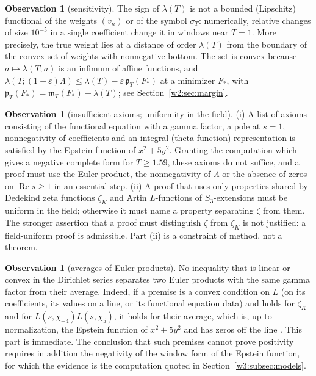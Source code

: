 \documentclass[11pt]{amsart}
\theoremstyle{definition}
\newtheorem{observation}[theorem]{Observation}
\theoremstyle{remark}
\numberwithin{equation}{section}
\DeclareMathOperator{\Rel}{Re}
\newcommand{\mT}{\mathfrak{m}_T}                       %
\newcommand{\pT}{\mathfrak{p}_T}                       %
\newcommand{\sT}{\sigma_T}                             %
\newcommand{\lam}{\lambda(T)}                          %
\begin{document}
\begin{observation}[sensitivity]\label{w3:bar:B7}
The sign of $\lam$ is not a bounded (Lipschitz) functional of the weights $(v_n)$ or of the symbol $\sT$:
numerically, relative changes of size $10^{-5}$ in a single coefficient change it in windows near $T=1$. More
precisely, the true weight lies at a distance of order $\lam$ from the boundary of the convex set of weights with
nonnegative bottom. The set is convex because $a\mapsto\lambda(T;a)$ is an infimum of affine functions, and
$\lambda(T;(1+\varepsilon)\Lambda)\le\lam-\varepsilon\,\pT(F_*)$ at a minimizer $F_*$, with
$\pT(F_*)=\mT(F_*)-\lam$; see Section~\ref{w2:sec:margin}.
\end{observation}

\begin{observation}[insufficient axioms; uniformity in the field]\label{w3:bar:B8}
(i) A list of axioms consisting of the functional equation with a gamma factor, a pole at $s=1$, nonnegativity
of coefficients and an integral (theta-function) representation is satisfied by the Epstein function of
$x^2+5y^2$. Granting the computation which gives a negative complete form for $T\ge1.59$, these axioms do not
suffice, and a proof must use the Euler product, the nonnegativity of $\Lambda$ or the absence of zeros on
$\Rel s\ge1$ in an essential step. (ii) A proof that uses only properties shared by Dedekind zeta functions
$\zeta_K$ and Artin $L$-functions of $S_3$-extensions must be uniform in the field; otherwise it must name a
property separating $\zeta$ from them. The stronger assertion that a proof must distinguish $\zeta$ from $\zeta_K$
is not justified: a field-uniform proof is admissible. Part (ii) is a constraint of method, not a theorem.
\end{observation}

\begin{observation}[averages of Euler products]\label{w3:bar:B9}
No inequality that is linear or convex in the Dirichlet series separates two Euler products with the same gamma
factor from their average. Indeed, if a premise is a convex condition on $L$ (on its coefficients, its values on
a line, or its functional equation data) and holds for $\zeta_K$ and for $L(s,\chi_{-4})L(s,\chi_5)$, it holds for
their average, which is, up to normalization, the Epstein function of $x^2+5y^2$ and has zeros off the line
\cite{DavenportHeilbronn1936}. This part is immediate. The conclusion that such premises cannot prove
positivity requires in addition the negativity of the window form of the Epstein function, for which the evidence
is the computation quoted in Section~\ref{w3:subsec:models}.
\end{observation}
\end{document}
